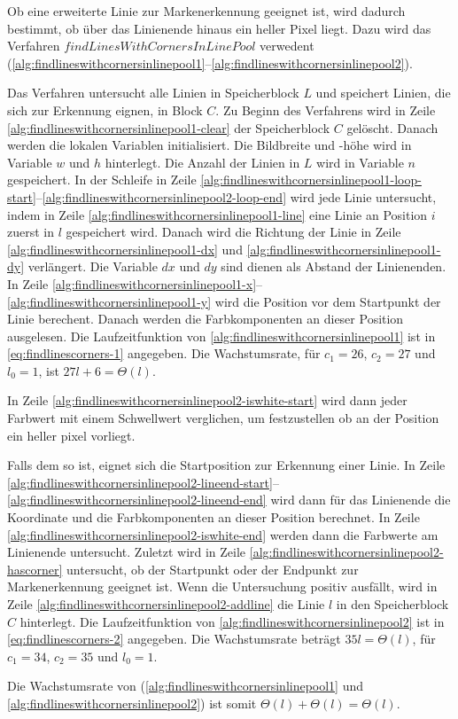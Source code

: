 Ob eine erweiterte Linie zur Markenerkennung geeignet ist, wird dadurch bestimmt, ob über das Linienende hinaus ein
 heller Pixel liegt. Dazu wird das Verfahren $\mathit{findLinesWithCornersInLinePool}$ verwedent
 (\autoref{alg:findlineswithcornersinlinepool1}--\autoref{alg:findlineswithcornersinlinepool2}).

Das Verfahren untersucht alle Linien in Speicherblock $L$ und speichert Linien, die sich zur Erkennung eignen, in Block
 $C$. Zu Beginn des Verfahrens wird in Zeile \ref{alg:findlineswithcornersinlinepool1-clear} der Speicherblock $C$
 gelöscht. Danach werden die lokalen Variablen initialisiert. Die Bildbreite und -höhe wird in Variable $w$ und $h$
 hinterlegt. Die Anzahl der Linien in $L$ wird in Variable $n$ gespeichert. In der Schleife in Zeile
 \ref{alg:findlineswithcornersinlinepool1-loop-start}--\ref{alg:findlineswithcornersinlinepool2-loop-end} wird jede
 Linie untersucht, indem in Zeile \ref{alg:findlineswithcornersinlinepool1-line} eine Linie an Position $i$ zuerst in
 $l$ gespeichert wird. Danach wird die Richtung der Linie in Zeile \ref{alg:findlineswithcornersinlinepool1-dx} und
 \ref{alg:findlineswithcornersinlinepool1-dy} verlängert. Die Variable $dx$ und $dy$ sind dienen als Abstand der
 Linienenden. In Zeile \ref{alg:findlineswithcornersinlinepool1-x}--\ref{alg:findlineswithcornersinlinepool1-y} wird
 die Position vor dem Startpunkt der Linie berechent. Danach werden die Farbkomponenten an dieser Position ausgelesen.
 Die Laufzeitfunktion von \autoref{alg:findlineswithcornersinlinepool1} ist in \autoref{eq:findlinescorners-1}
 angegeben. Die Wachstumsrate, für $c_{1} = 26$, $c_{2} = 27$ und $l_{0} = 1$, ist $27l + 6 = \Theta(l)$.

In Zeile \ref{alg:findlineswithcornersinlinepool2-iswhite-start} wird dann jeder Farbwert mit einem Schwellwert
 verglichen, um festzustellen ob an der Position ein heller \gls{pixel} vorliegt.

Falls dem so ist, eignet sich die Startposition zur Erkennung einer Linie. In Zeile
 \ref{alg:findlineswithcornersinlinepool2-lineend-start}--\ref{alg:findlineswithcornersinlinepool2-lineend-end} wird
 dann für das Linienende die Koordinate und die Farbkomponenten an dieser Position berechnet. In Zeile
 \ref{alg:findlineswithcornersinlinepool2-iswhite-end} werden dann die Farbwerte am Linienende untersucht. Zuletzt wird
 in Zeile \ref{alg:findlineswithcornersinlinepool2-hascorner} untersucht, ob der Startpunkt oder der Endpunkt zur
 Markenerkennung geeignet ist. Wenn die Untersuchung positiv ausfällt, wird in Zeile
 \ref{alg:findlineswithcornersinlinepool2-addline} die Linie $l$ in den Speicherblock $C$ hinterlegt. Die
 Laufzeitfunktion von \autoref{alg:findlineswithcornersinlinepool2} ist in \autoref{eq:findlinescorners-2} angegeben.
 Die Wachstumsrate beträgt $35l = \Theta(l)$, für $c_{1}=34$, $c_{2}=35$ und $l_{0}=1$.

Die Wachstumsrate von 
 (\autoref{alg:findlineswithcornersinlinepool1} und \autoref{alg:findlineswithcornersinlinepool2}) ist somit
 $\Theta(l) + \Theta(l) = \Theta(l)$.

